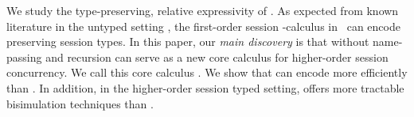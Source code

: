 We study the type-preserving, 
relative expressivity of \HOp. %
As expected from 
known literature in the untyped setting \cite{SangiorgiD:expmpa}, 
the first-order session \sessp-calculus  
in~\cite{honda.vasconcelos.kubo:language-primitives} can encode  
\HOp preserving session types. 
In this paper, 
our \emph{main discovery} is 
that 
\HOp 
without
name-passing and recursion
can serve as a new core calculus    
for higher-order session concurrency.  
We call this core calculus \HO. 
We show that \HO can encode \HOp more efficiently 
than \sessp. In addition, in the higher-order session typed setting, 
\HO offers more tractable bisimulation techniques 
than \sessp. 







